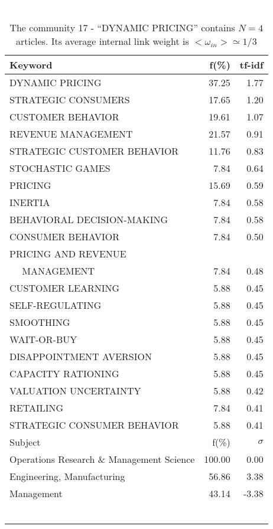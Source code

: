 \documentclass[a4paper,11pt]{report}
\begin{document}
\begin{landscape}
\begin{table}[!ht]
\caption{The community 17 - ``DYNAMIC PRICING'' contains $N = 4$ articles. Its average internal link weight is $<\omega_{in}> \simeq 1/3$ }
\textcolor{white}{aa}\\
{\scriptsize\begin{tabular}{|l r  r|}
\hline
Keyword & f(\%) & tf-idf \\
\hline
DYNAMIC PRICING & 37.25 & 1.77\\
STRATEGIC CONSUMERS & 17.65 & 1.20\\
CUSTOMER BEHAVIOR & 19.61 & 1.07\\
REVENUE MANAGEMENT & 21.57 & 0.91\\
STRATEGIC CUSTOMER BEHAVIOR & 11.76 & 0.83\\
STOCHASTIC GAMES & 7.84 & 0.64\\
PRICING & 15.69 & 0.59\\
INERTIA & 7.84 & 0.58\\
BEHAVIORAL DECISION-MAKING & 7.84 & 0.58\\
CONSUMER BEHAVIOR & 7.84 & 0.50\\
PRICING AND REVENUE &  &\\
$\quad$ MANAGEMENT & 7.84 & 0.48\\
CUSTOMER LEARNING & 5.88 & 0.45\\
SELF-REGULATING & 5.88 & 0.45\\
SMOOTHING & 5.88 & 0.45\\
WAIT-OR-BUY & 5.88 & 0.45\\
DISAPPOINTMENT AVERSION & 5.88 & 0.45\\
CAPACITY RATIONING & 5.88 & 0.45\\
VALUATION UNCERTAINTY & 5.88 & 0.42\\
RETAILING & 7.84 & 0.41\\
STRATEGIC CONSUMER BEHAVIOR & 5.88 & 0.41\\
\hline
\hline
Subject & f(\%) & $\sigma$\\
\hline
Operations Research \& Management Science & 100.00 & 0.00\\
Engineering, Manufacturing & 56.86 & 3.38\\
Management & 43.14 & -3.38\\
 &  & \\
 &  & \\
 &  & \\
 &  & \\
 &  & \\
 &  & \\

\end{tabular}}
\end{table}
\end{landscape}
\end{document}
